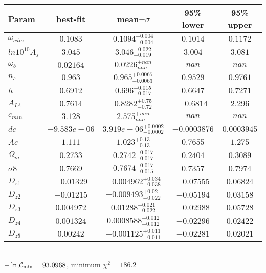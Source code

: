 \begin{tabular}{|l|c|c|c|c|} 
 \hline 
Param & best-fit & mean$\pm\sigma$ & 95\% lower & 95\% upper \\ \hline 
$\omega_{cdm }$ &$0.1083$ & $0.1094_{-0.004}^{+0.004}$ & $0.1014$ & $0.1172$ \\ 
$ln10^{10}A_{s }$ &$3.045$ & $3.046_{-0.019}^{+0.022}$ & $3.004$ & $3.081$ \\ 
$\omega_{b }$ &$0.02164$ & $0.0226_{nan}^{+nan}$ & $nan$ & $nan$ \\ 
$n_{s }$ &$0.963$ & $0.965_{-0.0063}^{+0.0065}$ & $0.9529$ & $0.9761$ \\ 
$h$ &$0.6912$ & $0.696_{-0.017}^{+0.015}$ & $0.6647$ & $0.7271$ \\ 
$A_{IA }$ &$0.7614$ & $0.8282_{-0.72}^{+0.75}$ & $-0.6814$ & $2.296$ \\ 
$c_{min }$ &$3.128$ & $2.575_{nan}^{+nan}$ & $nan$ & $nan$ \\ 
$dc$ &$-9.583e-06$ & $3.919e-06_{-0.0002}^{+0.0002}$ & $-0.0003876$ & $0.0003945$ \\ 
$Ac$ &$1.111$ & $1.023_{-0.13}^{+0.13}$ & $0.7655$ & $1.275$ \\ 
$\Omega_{m }$ &$0.2733$ & $0.2742_{-0.017}^{+0.017}$ & $0.2404$ & $0.3089$ \\ 
$\sigma8$ &$0.7669$ & $0.7674_{-0.015}^{+0.017}$ & $0.7357$ & $0.7974$ \\ 
$D_{z1 }$ &$-0.01329$ & $-0.004962_{-0.038}^{+0.034}$ & $-0.07555$ & $0.06824$ \\ 
$D_{z2 }$ &$-0.01215$ & $-0.009493_{-0.022}^{+0.02}$ & $-0.05194$ & $0.03158$ \\ 
$D_{z3 }$ &$0.004972$ & $0.01288_{-0.022}^{+0.021}$ & $-0.02988$ & $0.05728$ \\ 
$D_{z4 }$ &$0.001324$ & $0.0008588_{-0.012}^{+0.012}$ & $-0.02296$ & $0.02422$ \\ 
$D_{z5 }$ &$0.00242$ & $-0.001125_{-0.011}^{+0.011}$ & $-0.02281$ & $0.02021$ \\ 
\hline 
 \end{tabular} \\ 
$-\ln{\cal L}_\mathrm{min} =93.0968$, minimum $\chi^2=186.2$ \\ 
